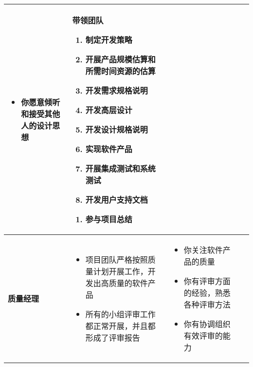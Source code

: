 \begin{spacing}{1.2}
\begin{longtable}{|m{1.5cm}<{\centering}|m{4.2cm}|m{4.2cm}|m{4.2cm}|}
\begin{itemize}[leftmargin=1.3em]
            \item 你愿意倾听和接受其他人的设计思想
            \vspace{-1.3em}
        \end{itemize} &
        带领团队
        \vspace{0.2em}
        \begin{enumerate}[label=\arabic*.,leftmargin=2.1em]
            \item 制定开发策略
            \item 开展产品规模估算和所需时间资源的估算
            \item 开发需求规格说明
            \item 开发高层设计
            \item 开发设计规格说明
            \item 实现软件产品
            \item 开展集成测试和系统测试
            \item 开发用户支持文档
        \end{enumerate}
        \vspace{0.3em}
        \begin{enumerate}[label=9.,leftmargin=1.5em]
            \item 参与项目总结
            \vspace{-1.3em}
        \end{enumerate} \\ \hline
        \textbf{质量经理} & 
        \vspace{-1.1em}
        \begin{itemize}[leftmargin=1.3em]
            \item 项目团队严格按照质量计划开展工作，开发出高质量的软件产品
            \item 所有的小组评审工作都正常开展，并且都形成了评审报告
            \vspace{-1.3em}
        \end{itemize} &
        \vspace{-1.1em}
        \begin{itemize}[leftmargin=1.3em]
            \item 你关注软件产品的质量
            \item 你有评审方面的经验，熟悉各种评审方法
            \item 你有协调组织有效评审的能力
            \vspace{-1.3em}
        \end{itemize} &
        \vspace{-1.1em}

\end{longtable}
\end{spacing}
